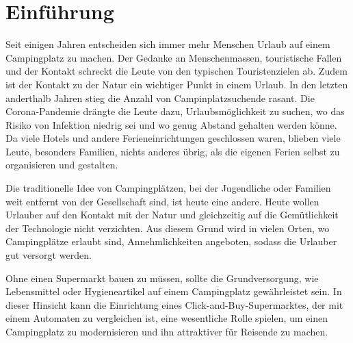 \section{Einführung}



Seit einigen Jahren entscheiden sich immer mehr Menschen Urlaub auf einem Campingplatz zu machen. 
Der Gedanke an Menschenmassen, touristische Fallen und der Kontakt schreckt die Leute von den typischen
Touristenzielen ab. Zudem ist der Kontakt zu der Natur ein wichtiger Punkt in einem Urlaub. 
In den letzten anderthalb Jahren stieg die Anzahl von Campinplatzsuchende rasant. 
Die Corona-Pandemie drängte die Leute dazu, Urlaubsmöglichkeit zu suchen, wo das
Risiko von Infektion niedrig sei und wo genug Abstand gehalten werden könne. Da viele Hotels
und andere Ferieneinrichtungen geschlossen waren, blieben viele Leute, besonders Familien, nichts anderes 
übrig, als die eigenen Ferien selbst zu organisieren und gestalten.

Die traditionelle Idee von Campingplätzen, bei der Jugendliche oder Familien weit entfernt von der
Gesellschaft sind, ist heute eine andere. Heute wollen Urlauber auf den Kontakt mit 
der Natur und gleichzeitig auf die Gemütlichkeit der Technologie nicht verzichten. Aus diesem
Grund wird in vielen Orten, wo Campingplätze erlaubt sind, Annehmlichkeiten angeboten, sodass 
die Urlauber gut versorgt werden.

Ohne einen Supermarkt bauen zu müssen, sollte die Grundversorgung, wie Lebensmittel oder Hygieneartikel
auf einem Campingplatz gewährleistet sein. In dieser Hinsicht kann die Einrichtung eines Click-and-Buy-Supermarktes,
der mit einem Automaten zu vergleichen ist, eine wesentliche Rolle spielen, um einen Campingplatz zu modernisieren
und ihn attraktiver für Reisende zu machen.

